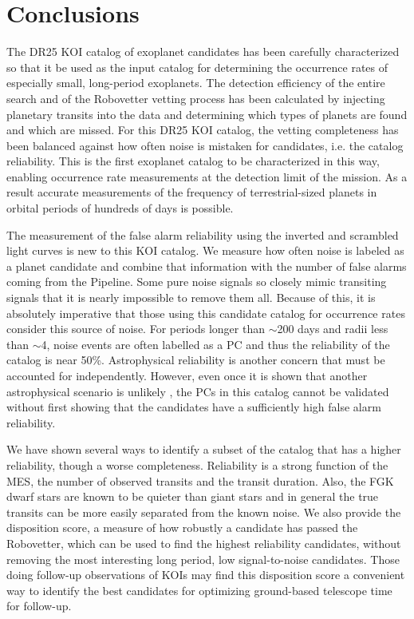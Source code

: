 

\section{Conclusions}

The DR25 KOI catalog of exoplanet candidates has been carefully characterized so that it be used as the input catalog for determining the occurrence rates of especially small, long-period exoplanets. The detection efficiency of the entire search \citep{Burke2017b,Christiansen2017} and of the Robovetter vetting process has been calculated by injecting planetary transits into the data and determining which types of planets are found and which are missed. For this DR25 KOI catalog, the vetting completeness has been balanced against how often noise is mistaken for candidates, i.e. the catalog reliability. This is the first \Kepler{} exoplanet catalog to be characterized in this way, enabling occurrence rate measurements at the detection limit of the mission.  As a result accurate measurements of the frequency of terrestrial-sized planets in orbital periods of hundreds of days is possible.

The measurement of the false alarm reliability using the inverted and scrambled light curves is new to this KOI catalog. We measure how often noise is labeled as a planet candidate and combine that information with the number of false alarms coming from the \Kepler{} Pipeline. Some pure noise signals so closely mimic transiting signals that it is nearly impossible to remove them all. Because of this, it is absolutely imperative that those using this candidate catalog for occurrence rates consider this source of noise. For periods longer than $\sim$200 days and radii less than $\sim$4\Rearth, noise events are often labelled as a PC and thus the reliability of the catalog is near 50\%.  Astrophysical reliability is another concern that must be accounted for independently.  However, even once it is shown that another astrophysical scenario is unlikely \citep[as was done for the DR24 KOIs in ][]{Morton2017}, the PCs in this catalog cannot be validated without first showing that the candidates have a sufficiently high false alarm reliability. 

We have shown several ways to identify a subset of the catalog that has a higher reliability, though a worse completeness. Reliability is a strong function of the MES, the number of observed transits and the transit duration. Also, the FGK dwarf stars are known to be quieter than giant stars and in general the true transits can be more easily separated from the known noise. We also provide the disposition score, a measure of how robustly a candidate has passed the Robovetter, which can be used to find the highest reliability candidates, without removing the most interesting long period, low signal-to-noise candidates. Those doing follow-up observations of KOIs may find this disposition score a convenient way to identify the best candidates for optimizing ground-based telescope time for follow-up.

